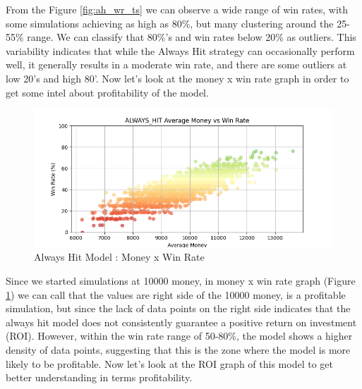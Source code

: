 \documentclass[a4paper,12pt]{report}
\begin{document}
From the Figure \ref{fig:ah_wr_ts} we can observe a wide range of win rates, with some simulations achieving as high as 80\%, but many clustering around the 25-55\% range. We can classify that 80\%'s and win rates below 20\% as outliers. This variability indicates that while the Always Hit strategy can occasionally perform well, it generally results in a moderate win rate, and there are some outliers at low 20's and high 80'. Now let's look at the money x win rate graph in order to get some intel about profitability of the model.

\begin{figure}[h]
\begin{center}
\includegraphics[scale=0.6]{figures/graphs/ah_money_wr_big.png}
\end{center}
\caption{Always Hit Model : Money x Win Rate}
\label{fig:ah_money_wr}
\end{figure}

Since we started simulations at 10000 money, in money x win rate graph (Figure \ref{fig:ah_money_wr}) we can call that the values are right side of the 10000 money, is a profitable simulation, but since the lack of data points on the right side indicates that the always hit model does not consistently guarantee a positive return on investment (ROI). However, within the win rate range of 50-80\%, the model shows a higher density of data points, suggesting that this is the zone where the model is more likely to be profitable. Now let's look at the ROI graph of this model to get better understanding in terms profitability.
\end{document}
